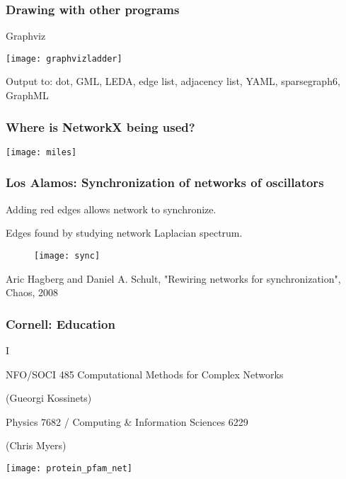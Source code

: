 \documentclass[xcolor=dvipsnames, 9pt]{beamer}
\begin{document}
\begin{frame}[fragile]
\frametitle{Drawing with other programs}
\centerline{Graphviz}
\centerline{\texttt{[image: graphvizladder]}}

Output to: dot, GML, LEDA, edge list, adjacency list, YAML, 
sparsegraph6, GraphML

\end{frame}


\begin{frame}
\frametitle{Where is NetworkX being used?}
\centerline{\texttt{[image: miles]}}
\end{frame}




\begin{frame}
\frametitle{Los Alamos: Synchronization of networks of oscillators}

Adding red edges allows network to synchronize.

Edges found by studying network Laplacian spectrum.

\begin{figure}[ht]

\centerline{\texttt{[image: sync]}}
\end{figure}

{\footnotesize
Aric Hagberg and Daniel A. Schult, "Rewiring networks for
synchronization", Chaos, %
2008 }

\end{frame}


\begin{frame}
\frametitle{Cornell: Education}

\centerline
INFO/SOCI 485 Computational Methods for Complex Networks  

(Gueorgi Kossinets)

Physics 7682 / Computing \& Information Sciences 6229 

(Chris Myers)

\centerline{\texttt{[image: protein\_pfam\_net]}}

\end{frame}
\end{document}
